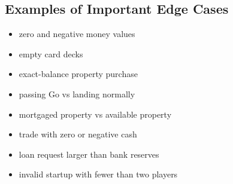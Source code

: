 \documentclass[12pt]{article}
\begin{document}
\subsection{Examples of Important Edge Cases}
\begin{itemize}
\item zero and negative money values
\item empty card decks
\item exact-balance property purchase
\item passing Go vs landing normally
\item mortgaged property vs available property
\item trade with zero or negative cash
\item loan request larger than bank reserves
\item invalid startup with fewer than two players
\end{itemize}
\end{document}
